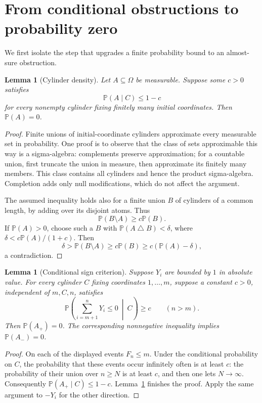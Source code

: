 \documentclass[11pt,letterpaper]{article}
\newtheorem{lemma}[theorem]{Lemma}
\theoremstyle{definition}
\newcommand{\Prb}{\mathbb P}
\begin{document}
\section{From conditional obstructions to probability zero}
\label{mbg:qry:sec:conditional}

We first isolate the step that upgrades a finite probability bound to an
almost-sure obstruction.

\begin{lemma}[Cylinder density]
\label{mbg:qry:lem:density}
Let \(A\subseteq\Omega\) be measurable. Suppose some \(c>0\) satisfies
\[
 \Prb(A\mid C)\le1-c
\]
for every nonempty cylinder fixing finitely many initial coordinates.
Then \(\Prb(A)=0\).
\end{lemma}

\begin{proof}
Finite unions of initial-coordinate cylinders approximate every measurable
set in probability. One proof is to observe that the class of sets
approximable this way is a sigma-algebra: complements preserve
approximation; for a countable union, first truncate the union in measure,
then approximate its finitely many members. This class contains all
cylinders and hence the product sigma-algebra. Completion adds only null
modifications, which do not affect the argument.

The assumed inequality holds also for a finite union \(B\) of cylinders
of a common length, by adding over its disjoint atoms. Thus
\[
 \Prb(B\setminus A)\ge c\Prb(B).
\]
If \(\Prb(A)>0\), choose such a \(B\) with
\(\Prb(A\mathbin{\triangle}B)<\delta\), where
\(\delta<c\Prb(A)/(1+c)\). Then
\[
 \delta>\Prb(B\setminus A)\ge c\Prb(B)
 \ge c(\Prb(A)-\delta),
\]
a contradiction.
\end{proof}

\begin{lemma}[Conditional sign criterion]
\label{mbg:qry:lem:conditional-sign}
Suppose \(Y_i\) are bounded by \(1\) in absolute value. For every
cylinder \(C\) fixing coordinates \(1,\ldots,m\), suppose a constant
\(c>0\), independent of \(m,C,n\), satisfies
\[
 \Prb\left(\sum_{i=m+1}^nY_i\le0\ \middle|\ C\right)\ge c
 \qquad(n>m).
\]
Then \(\Prb(A_+)=0\). The corresponding nonnegative inequality implies
\(\Prb(A_-)=0\).
\end{lemma}

\begin{proof}
On each of the displayed events \(F_n\le m\). Under the conditional
probability on \(C\), the probability that these events occur infinitely
often is at least \(c\): the probability of their union over \(n\ge N\)
is at least \(c\), and then one lets \(N\to\infty\).
Consequently \(\Prb(A_+\mid C)\le1-c\).
Lemma~\ref{mbg:qry:lem:density} finishes the proof. Apply the same argument to
\(-Y_i\) for the other direction.
\end{proof}
\end{document}
